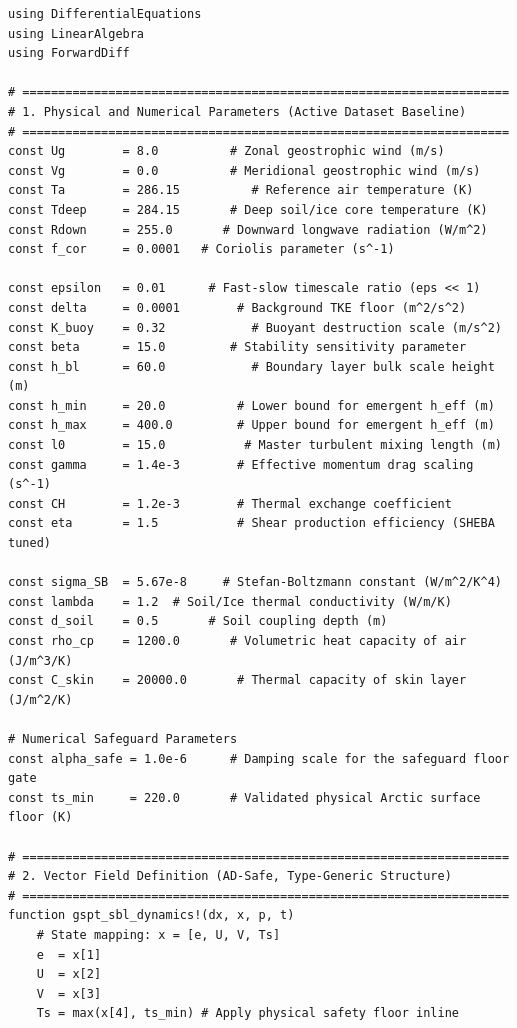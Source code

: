 \documentclass[11pt,letterpaper]{article}
\begin{document}
\begingroup
\footnotesize
\begin{verbatim}
using DifferentialEquations
using LinearAlgebra
using ForwardDiff

# ====================================================================
# 1. Physical and Numerical Parameters (Active Dataset Baseline)
# ====================================================================
const Ug        = 8.0          # Zonal geostrophic wind (m/s)
const Vg        = 0.0          # Meridional geostrophic wind (m/s)
const Ta        = 286.15          # Reference air temperature (K)
const Tdeep     = 284.15       # Deep soil/ice core temperature (K)
const Rdown     = 255.0       # Downward longwave radiation (W/m^2)
const f_cor     = 0.0001   # Coriolis parameter (s^-1)

const epsilon   = 0.01      # Fast-slow timescale ratio (eps << 1)
const delta     = 0.0001        # Background TKE floor (m^2/s^2)
const K_buoy    = 0.32            # Buoyant destruction scale (m/s^2)
const beta      = 15.0         # Stability sensitivity parameter
const h_bl      = 60.0            # Boundary layer bulk scale height (m)
const h_min     = 20.0          # Lower bound for emergent h_eff (m)
const h_max     = 400.0         # Upper bound for emergent h_eff (m)
const l0        = 15.0           # Master turbulent mixing length (m)
const gamma     = 1.4e-3        # Effective momentum drag scaling (s^-1)
const CH        = 1.2e-3        # Thermal exchange coefficient
const eta       = 1.5           # Shear production efficiency (SHEBA tuned)

const sigma_SB  = 5.67e-8     # Stefan-Boltzmann constant (W/m^2/K^4)
const lambda    = 1.2  # Soil/Ice thermal conductivity (W/m/K)
const d_soil    = 0.5       # Soil coupling depth (m)
const rho_cp    = 1200.0       # Volumetric heat capacity of air (J/m^3/K)
const C_skin    = 20000.0       # Thermal capacity of skin layer (J/m^2/K)

# Numerical Safeguard Parameters
const alpha_safe = 1.0e-6      # Damping scale for the safeguard floor gate
const ts_min     = 220.0       # Validated physical Arctic surface floor (K)

# ====================================================================
# 2. Vector Field Definition (AD-Safe, Type-Generic Structure)
# ====================================================================
function gspt_sbl_dynamics!(dx, x, p, t)
    # State mapping: x = [e, U, V, Ts]
    e  = x[1]
    U  = x[2]
    V  = x[3]
    Ts = max(x[4], ts_min) # Apply physical safety floor inline


\end{verbatim}
\end{document}
